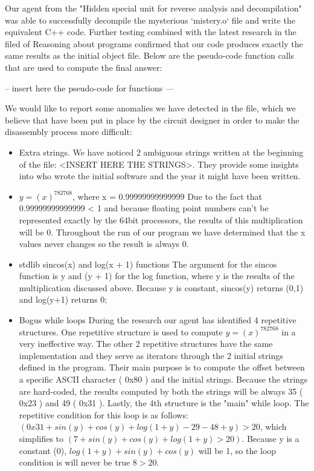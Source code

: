 Our agent from the "Hidden special unit for reverse analysis and decompilation" was able to successfully decompile the mysterious `mistery.o` file and write the equivalent C++ code. Further testing combined with the latest research in the filed of Reasoning about programs confirmed that our code produces exactly the same results as the initial object file. Below are the pseudo-code function calls that are used to compute the final answer: 

-- insert here the pseudo-code for functions ---

We would like to report some anomalies we have detected in the file, which we believe that have been put in place by the circuit designer in order to make the disassembly process more difficult:

\begin{itemize}
 \item Extra strings.
 We have noticed 2 ambiguous strings written at the beginning of the file: <INSERT HERE THE STRINGS>. They provide some insights into who wrote the initial software and the year it might have been written. 
 \item $y = (x)^782768$, where x = 0.99999999999999 
 Due to the fact that 0.99999999999999 < 1 and because floating point numbers can't be represented exactly by the 64bit processors, the results of this multiplication will be 0. Throughout the run of our program we have determined that the x values never changes so the result is always 0.
 \item stdlib sincos(x) and log(x + 1) functions
 The argument for the sincos function is y and (y + 1) for the log function, where y is the results of the multiplication discussed above. Because y is constant, sincos(y) returns (0,1) and log(y+1) returns 0;
 \item Bogus while loops
 During the research our agent has identified 4 repetitive structures. One repetitive structure is used to compute $y = (x)^782768$ in a very ineffective way. The other 2 repetitive structures have the same implementation and they serve as iterators through the 2 initial strings defined in the program. Their main purpose is to compute the offset between a specific ASCII character ( 0x80 ) and the initial strings. Because the strings are hard-coded, the results computed by both the strings will be always 35 ( 0x23 ) and 49 ( 0x31 ). 
 Lastly, the 4th structure is the "main" while loop. The repetitive condition for this loop is as follows: $(0x31 + sin(y) + cos(y) + log(1+y) - 29 - 48 + y) > 20$, which simplifies to $(7 + sin(y) + cos(y) + log(1+y) > 20)$. Because y is a constant (0), $log(1+y) + sin(y) + cos(y)$ will be 1, so the loop condition is will never be true $8 > 20$.

\end{itemize}
